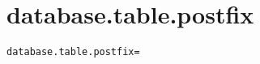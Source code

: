 \section{database.table.postfix}
\label{configuration:DatabaseTablePostfix}
\ClearAPI
\TODO
{}
\begin{lstlisting}[style=Props,caption={Usage example for \textit{database.table.postfix}}]
database.table.postfix=
\end{lstlisting}